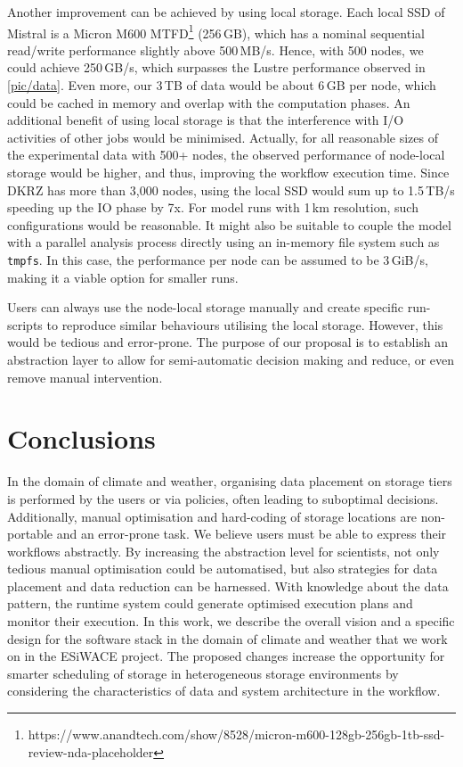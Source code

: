 \documentclass{superfri}
\begin{document}
Another improvement can be achieved by using local storage.
Each local SSD of Mistral is a Micron M600 MTFD\footnote{https://www.anandtech.com/show/8528/micron-m600-128gb-256gb-1tb-ssd-review-nda-placeholder} (256\,GB), which has a nominal sequential read/write performance slightly above 500\,MB/s.
Hence, with 500 nodes, we could achieve 250\,GB/s, which surpasses the Lustre performance observed in \cref{pic/data}.
Even more, our 3\,TB of data would be about 6\,GB per node, which could be cached in memory and overlap with the computation phases.
An additional benefit of using local storage is that the interference with I/O activities of other jobs would be minimised.
Actually, for all reasonable sizes of the experimental data with 500+ nodes, the observed performance of node-local storage would be higher, and thus, improving the workflow execution time.
Since DKRZ has more than 3,000 nodes, using the local SSD would sum up to 1.5\,TB/s speeding up the IO phase by 7x.
For model runs with 1\,km resolution, such configurations would be reasonable.
It might also be suitable to couple the model with a parallel analysis process directly using an in-memory file system such as \texttt{tmpfs}.
In this case, the performance per node can be assumed to be 3\,GiB/s, making it a viable option for smaller runs.

Users can always use the node-local storage manually and create specific run-scripts to reproduce similar behaviours utilising the local storage.
However, this would be tedious and error-prone.
The purpose of our proposal is to establish an abstraction layer to allow for semi-automatic decision making and reduce, or even remove manual intervention.

\section*{Conclusions}
\label{sec:conclusions}

In the domain of climate and weather, organising data placement on storage tiers is performed by the users or via policies, often leading to suboptimal decisions.
Additionally, manual optimisation and hard-coding of storage locations are non-portable and an error-prone task.
We believe users must be able to express their workflows abstractly.
By increasing the abstraction level for scientists, not only tedious manual optimisation could be automatised, but also strategies for data placement and data reduction can be harnessed.
With knowledge about the data pattern, the runtime system could generate optimised execution plans and monitor their execution.
In this work, we describe the overall vision and a specific design for the software stack in the domain of climate and weather that we work on in the ESiWACE project.
The proposed changes increase the opportunity for smarter scheduling of storage in heterogeneous storage environments by considering the characteristics of data and system architecture in the workflow.
\end{document}
